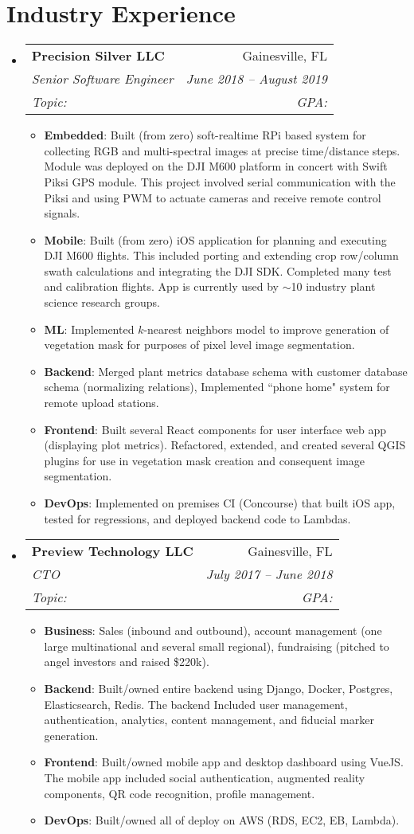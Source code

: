 \documentclass[letterpaper,11pt]{article}
\makeatletter
\newcommand{\resumeItem}[2]{
  \item\small{
    \textbf{#1}{#2 \vspace{-2pt}}
  }
}
\newcommand{\resumeSubheading}[6]{
  \vspace{-1pt}\item
    \begin{tabular*}{0.97\textwidth}{l@{\extracolsep{\fill}}r}
      \textbf{#1} & #2
      \ifthenelse{\equal{#3}{}}{}{
        \\ \textit{\small#3} & \textit{\small #4}
      } 
      \ifthenelse{\equal{#5}{}}{}{
        \\ \textit{\small Topic: #5} & \textit{\small GPA: #6}
      }
    \end{tabular*}\vspace{-5pt}
}
\newcommand{\resumeSubHeadingListStart}{\begin{itemize}[leftmargin=*]}
\newcommand{\resumeSubHeadingListEnd}{\end{itemize}}
\newcommand{\resumeItemListStart}{\begin{itemize}}
\newcommand{\resumeItemListEnd}{\end{itemize}\vspace{-5pt}}
\makeatother
\begin{document}
\section{Industry Experience}
  \resumeSubHeadingListStart
    \resumeSubheading
      {Precision Silver LLC}{Gainesville, FL}
      {Senior Software Engineer}{June 2018 -- August 2019}{}{}
      \resumeItemListStart
        \resumeItem{Embedded}
          {: Built (from zero) soft-realtime RPi based system for collecting RGB and multi-spectral images at precise time/distance steps. Module was deployed on the DJI M600 platform in concert with Swift Piksi GPS module. This project involved serial communication with the Piksi and using PWM to actuate cameras and receive remote control signals.}
        \resumeItem{Mobile}
          {: Built (from zero) iOS application for planning and executing DJI M600 flights. This included porting and extending crop row/column swath calculations and integrating the DJI SDK. Completed many test and calibration flights. App is currently used by \(\sim\)10 industry plant science research groups.}
        \resumeItem{ML}
          {: Implemented \(k\)-nearest neighbors model to improve generation of vegetation mask for purposes of pixel level image segmentation.}
        \resumeItem{Backend}
          {: Merged plant metrics database schema with customer database schema (normalizing relations), Implemented ``phone home" system for remote upload stations.}
        \resumeItem{Frontend}
          {: Built several React components for user interface web app (displaying plot metrics). Refactored, extended, and created several QGIS plugins for use in vegetation mask creation and consequent image segmentation.}
        \resumeItem{DevOps}
          {: Implemented on premises CI (Concourse) that built iOS app, tested for regressions, and deployed backend code to Lambdas.}
      \resumeItemListEnd
    \resumeSubheading
      {Preview Technology LLC}{Gainesville, FL}
      {CTO}{July 2017 -- June 2018}{}{}
      \resumeItemListStart
        \resumeItem{Business}
          {: Sales (inbound and outbound), account management (one large multinational and several small regional), fundraising (pitched to angel investors and raised \$220k).}
        \resumeItem{Backend}
          {: Built/owned entire backend using Django, Docker, Postgres, Elasticsearch, Redis. The backend Included user management, authentication, analytics, content management, and fiducial marker generation.}
        \resumeItem{Frontend}
          {: Built/owned mobile app and desktop dashboard using VueJS. The mobile app included social authentication, augmented reality components, QR code recognition, profile management.}
        \resumeItem{DevOps}
          {: Built/owned all of deploy on AWS (RDS, EC2, EB, Lambda).}
      \resumeItemListEnd
    \resumeSubHeadingListEnd
\end{document}

